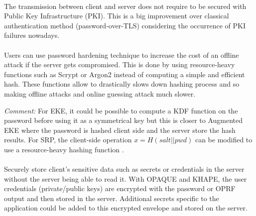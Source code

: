 ﻿\documentclass[../report.tex]{subfiles}
\begin{document}
\paragraph{} %
The transmission between client and server does not require to be secured with Public Key Infrastructure (PKI). This is a big improvement over classical authentication method (password-over-TLS) considering the occurrence of PKI failures nowadays. %


\paragraph{} \label{sec:password_hardening_comparison}
Users can use password hardening technique to increase the cost of an offline attack if the server gets compromised. This is done by using resource-heavy functions such as Scrypt \cite{Scrypt_Paper} or Argon2 \cite{Argon2_Paper} instead of computing a simple and efficient hash. These functions allow to drastically slows down hashing process and so making offline attacks and online guessing attack much slower.

\emph{Comment:} For EKE, it could be possible to compute a KDF function on the password before using it as a symmetrical key but this is closer to Augmented EKE \cite{AEKE_Paper} where the password is hashed client side and the server store the hash results.
For SRP, the client-side operation $x = H(salt||pwd)$ can be modified to use a resource-heavy hashing function \cite{SRP_1Password_blog}.


\paragraph{}
Securely store client's sensitive data such as secrets or credentials in the server without the server being able to read it. With OPAQUE and KHAPE, the user credentials (private/public keys) are encrypted with the password or OPRF output and then stored in the server. Additional secrets specific to the application could be added to this encrypted envelope and stored on the server.
\end{document}

